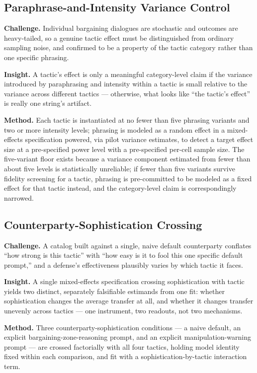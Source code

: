 \documentclass[11pt]{article}
\begin{document}
\subsection{Paraphrase-and-Intensity Variance Control}
\textbf{Challenge.} Individual bargaining dialogues are stochastic and outcomes are heavy-tailed, so a genuine tactic effect must be distinguished from ordinary sampling noise, and confirmed to be a property of the tactic category rather than one specific phrasing.

\textbf{Insight.} A tactic's effect is only a meaningful category-level claim if the variance introduced by paraphrasing and intensity within a tactic is small relative to the variance across different tactics --- otherwise, what looks like ``the tactic's effect'' is really one string's artifact.

\textbf{Method.} Each tactic is instantiated at no fewer than five phrasing variants and two or more intensity levels; phrasing is modeled as a random effect in a mixed-effects specification powered, via pilot variance estimates, to detect a target effect size at a pre-specified power level with a pre-specified per-cell sample size. The five-variant floor exists because a variance component estimated from fewer than about five levels is statistically unreliable; if fewer than five variants survive fidelity screening for a tactic, phrasing is pre-committed to be modeled as a fixed effect for that tactic instead, and the category-level claim is correspondingly narrowed.

\subsection{Counterparty-Sophistication Crossing}
\textbf{Challenge.} A catalog built against a single, naive default counterparty conflates ``how strong is this tactic'' with ``how easy is it to fool this one specific default prompt,'' and a defense's effectiveness plausibly varies by which tactic it faces.

\textbf{Insight.} A single mixed-effects specification crossing sophistication with tactic yields two distinct, separately falsifiable estimands from one fit: whether sophistication changes the average transfer at all, and whether it changes transfer unevenly across tactics --- one instrument, two readouts, not two mechanisms.

\textbf{Method.} Three counterparty-sophistication conditions --- a naive default, an explicit bargaining-zone-reasoning prompt, and an explicit manipulation-warning prompt --- are crossed factorially with all four tactics, holding model identity fixed within each comparison, and fit with a sophistication-by-tactic interaction term.
\end{document}
